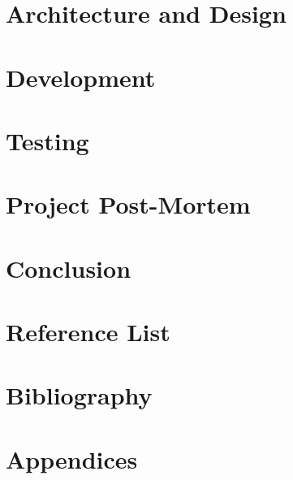 \documentclass{article}
\begin{document}
\section{Architecture and Design}

\section{Development}

\section{Testing}


\section{Project Post-Mortem}

\section{Conclusion}

\section{Reference List}

\section{Bibliography}

\section{Appendices}
\end{document}
